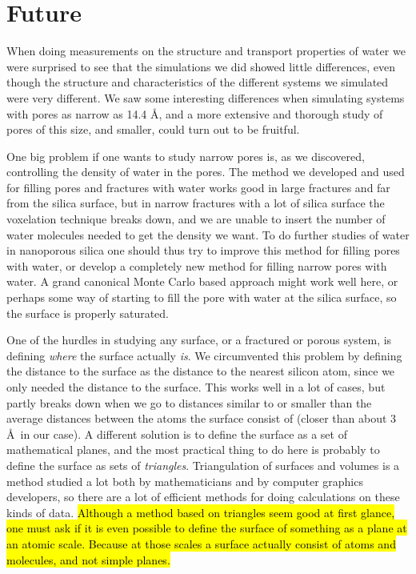 \section{Future}
When doing measurements on the structure and transport properties of water we were surprised to see that the simulations we did showed little differences, even though the structure and characteristics of the different systems we simulated were very different. We saw some interesting differences when simulating systems with pores as narrow as 14.4 \AA, and a more extensive and thorough study of pores of this size, and smaller, could turn out to be fruitful. 

One big problem if one wants to study narrow pores is, as we discovered, controlling the density of water in the pores. The method we developed and used for filling pores and fractures with water works good in large fractures and far from the silica surface, but in narrow fractures with a lot of silica surface the voxelation technique breaks down, and we are unable to insert the number of water molecules needed to get the density we want. To do further studies of water in nanoporous silica one should thus try to improve this method for filling pores with water, or develop a completely new method for filling narrow pores with water. A grand canonical Monte Carlo based approach might work well here, or perhaps some way of starting to fill the pore with water at the silica surface, so the surface is properly saturated.

One of the hurdles in studying any surface, or a fractured or porous system, is defining \emph{where} the surface actually \emph{is}. We circumvented this problem by defining the distance to the surface as the distance to the nearest silicon atom, since we only needed the distance to the surface. This works well in a lot of cases, but partly breaks down when we go to distances similar to or smaller than the average distances between the atoms the surface consist of (closer than about 3 \AA\ in our case). A different solution is to define the surface as a set of mathematical planes, and the most practical thing to do here is probably to define the surface as sets of \emph{triangles}. Triangulation of surfaces and volumes is a method studied a lot both by mathematicians and by computer graphics developers, so there are a lot of efficient methods for doing calculations on these kinds of data. \hl{Although a method based on triangles seem good at first glance, one must ask if it is even possible to define the surface of something as a plane at an atomic scale. Because at those scales a surface actually consist of atoms and molecules, and not simple planes.}

